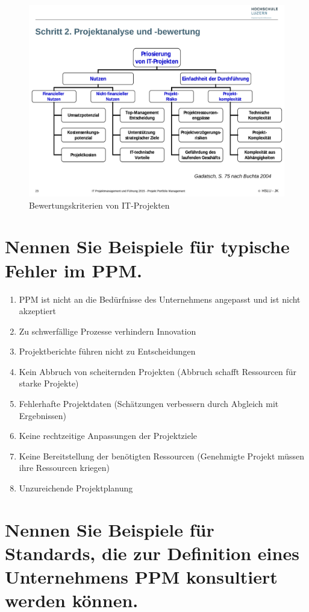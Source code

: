 \begin{figure}
\centering
\includegraphics[width=\linewidth]{fig/bewertung-it-projekt}
\caption{Bewertungskriterien von IT-Projekten}
\label{fig:bewertung-it-projekt}
\end{figure}

\section{Nennen Sie Beispiele für typische Fehler im PPM.}

\begin{enumerate}
	\item PPM ist nicht an die Bedürfnisse des Unternehmens angepasst und ist nicht akzeptiert
	\item Zu schwerfällige Prozesse verhindern Innovation
	\item Projektberichte führen nicht zu Entscheidungen
	\item Kein Abbruch von scheiternden Projekten (Abbruch schafft Ressourcen für starke Projekte)
	\item Fehlerhafte Projektdaten (Schätzungen verbessern durch Abgleich mit Ergebnissen)
	\item Keine rechtzeitige Anpassungen der Projektziele
	\item Keine Bereitstellung der benötigten Ressourcen (Genehmigte Projekt müssen ihre Ressourcen kriegen)
	\item Unzureichende Projektplanung
\end{enumerate}

\section{Nennen Sie Beispiele für Standards, die zur Definition eines Unternehmens PPM konsultiert werden können.}

